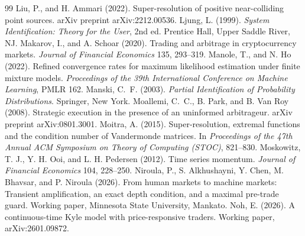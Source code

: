 \begin{thebibliography}{99}
 Liu, P., and H. Ammari (2022). Super-resolution of positive near-colliding point sources. arXiv preprint arXiv:2212.00536.
 Ljung, L. (1999). \emph{System Identification: Theory for the User}, 2nd ed. Prentice Hall, Upper Saddle River, NJ.
 Makarov, I., and A. Schoar (2020). Trading and arbitrage in cryptocurrency markets. \emph{Journal of Financial Economics} 135, 293--319.
 Manole, T., and N. Ho (2022). Refined convergence rates for maximum likelihood estimation under finite mixture models. \emph{Proceedings of the 39th International Conference on Machine Learning}, PMLR 162.
 Manski, C.~F. (2003). \emph{Partial Identification of Probability Distributions}. Springer, New York.
 Moallemi, C.~C., B. Park, and B. Van Roy (2008). Strategic execution in the presence of an uninformed arbitrageur. arXiv preprint arXiv:0801.3001.
 Moitra, A. (2015). Super-resolution, extremal functions and the condition number of Vandermonde matrices. In \emph{Proceedings of the 47th Annual ACM Symposium on Theory of Computing (STOC)}, 821--830.
 Moskowitz, T. J., Y. H. Ooi, and L. H. Pedersen (2012). Time series momentum. \emph{Journal of Financial Economics} 104, 228--250.
 Niroula, P., S. Alkhushayni, Y. Chen, M. Bhavsar, and P. Niroula (2026). From human markets to machine markets: Transient amplification, an exact depth condition, and a maximal pre-trade guard. Working paper, Minnesota State University, Mankato.
 Noh, E. (2026). A continuous-time Kyle model with price-responsive traders. Working paper, arXiv:2601.09872.


\end{thebibliography}
